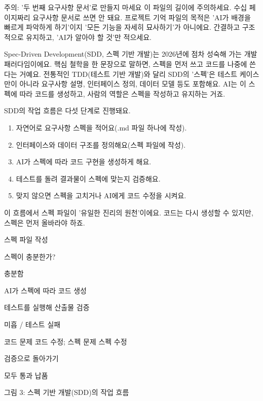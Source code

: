 \begin{tcbwarn}{주의: '두 번째 요구사항 문서'로 만들지 마세요}
이 파일의 길이에 주의하세요. 수십 페이지짜리 요구사항 문서로 쓰면 안 돼요. 프로젝트 기억 파일의 목적은 'AI가 배경을 빠르게 파악하게 하기'이지 '모든 기능을 자세히 묘사하기'가 아니에요. 간결하고 구조적으로 유지하고, 'AI가 알아야 할 것'만 적으세요.

\end{tcbwarn}


Spec-Driven Development(SDD, 스펙 기반 개발)는 2026년에 점차 성숙해 가는 개발 패러다임이에요. 핵심 철학을 한 문장으로 말하면, 스펙을 먼저 쓰고 코드를 나중에 쓴다는 거예요. 전통적인 TDD(테스트 기반 개발)와 달리 SDD의 '스펙'은 테스트 케이스만이 아니라 요구사항 설명, 인터페이스 정의, 데이터 모델 등도 포함해요. AI는 이 스펙에 따라 코드를 생성하고, 사람의 역할은 스펙을 작성하고 유지하는 거죠.

SDD의 작업 흐름은 다섯 단계로 진행돼요.

\begin{enumerate}
  \item 자연어로 요구사항 스펙을 적어요(.md 파일 하나에 작성).
  \item 인터페이스와 데이터 구조를 정의해요(스펙 파일에 작성).
  \item AI가 스펙에 따라 코드 구현을 생성하게 해요.
  \item 테스트를 돌려 결과물이 스펙에 맞는지 검증해요.
  \item 맞지 않으면 스펙을 고치거나 AI에게 코드 수정을 시켜요.
\end{enumerate}

이 흐름에서 스펙 파일이 '유일한 진리의 원천'이에요. 코드는 다시 생성할 수 있지만, 스펙은 먼저 올바라야 하죠.

스펙 파일 작성

스펙이 충분한가?

충분함

AI가 스펙에 따라 코드 생성

테스트를 실행해 산출물 검증

미흡 / 테스트 실패

코드 문제 코드 수정; 스펙 문제 스펙 수정

검증으로 돌아가기

모두 통과 납품

\begin{center}\small\color{gray}그림 3: 스펙 기반 개발(SDD)의 작업 흐름\end{center}

